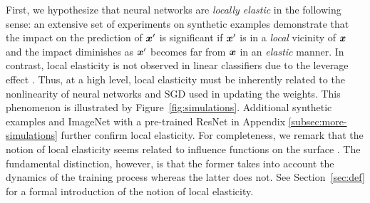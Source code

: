 
First, we hypothesize that neural networks are \textit{locally elastic} in the following sense: an extensive set of experiments on synthetic examples demonstrate that the impact on the prediction of $\bm{x}'$ is significant if $\bm{x}'$ is in a \textit{local} vicinity of $\bm{x}$ and the impact diminishes as $\bm{x}'$ becomes far from $\bm{x}$ in an \textit{elastic} manner. In contrast, local elasticity is not observed in linear classifiers due to the leverage effect \citep{weisberg2005applied}. Thus, at a high level, local elasticity must be inherently related to the nonlinearity of neural networks and SGD used in updating the weights. This phenomenon is illustrated by Figure~\ref{fig:simulations}. Additional synthetic examples and ImageNet \citep{deng2009imagenet} with a pre-trained ResNet \citep{he2016deep} in Appendix \ref{subsec:more-simulations} further confirm local elasticity. For completeness, we remark that the notion of local elasticity seems related to influence functions on the surface
\citep{koh2017understanding}. The fundamental distinction, however, is that the former takes into account the dynamics of the training process whereas the latter does not. See Section~\ref{sec:def} for a formal introduction of the notion of local elasticity.

